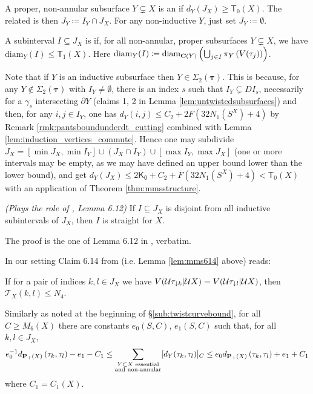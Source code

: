 \begin{defin}
A proper, non-annular subsurface $Y\subsetneq X$ is an  if $d_Y(J_X)\geq \mathsf{T}_0(X)$. The related  is then $J_Y\coloneqq I_Y\cap J_X$. For any non-inductive $Y$, just set $J_Y\coloneqq \emptyset$.

A subinterval $I\subseteq J_X$ is  if, for all non-annular, proper subsurfaces $Y\subsetneq X$, we have $\mathrm{diam}_Y(I)\leq\mathsf{T}_1(X)$. Here $\mathrm{diam}_Y(I)\coloneqq \mathrm{diam}_{\mathbf C(Y)}\left(\bigcup_{j\in I}\pi_Y\left(V(\tau_j)\right)\right)$.
\end{defin}
Note that if $Y$ is an inductive subsurface then $Y\in \Sigma_2(\bm\tau)$. This is because, for any $Y\not\in \Sigma_2(\bm\tau)$ with $I_Y\not=\emptyset$, there is an index $s$ such that $I_Y\subsetneq DI_s$, necessarily for a $\gamma_s$ intersecting $\partial Y$ (claims 1, 2 in Lemma \ref{lem:untwistedsubsurfaces}) and then, for any $i,j\in I_Y$, one has $d_Y(i,j)\leq C_2+2F(32N_1(S^X)+4)$ by Remark \ref{rmk:pantsboundunderdt_cutting} combined with Lemma \ref{lem:induction_vertices_commute}. Hence one may subdivide $J_X=[\min J_X, \min I_Y]\cup (J_X\cap I_Y) \cup [\max I_Y, \max J_X]$ (one or more intervals may be empty, as we may have defined an upper bound lower than the lower bound), and get $d_Y(J_X)\leq 2\mathsf{K_0} + C_2+F(32 N_1(S^X)+4)< \mathsf{T}_0(X)$ with an application of Theorem \ref{thm:mmsstructure}.

\begin{lemma}\label{lem:mms612} \emph{(Plays the role of \cite{mms}, Lemma 6.12)}
If $I\subseteq J_X$ is disjoint from all inductive subintervals of $J_X$, then $I$ is straight for $X$.
\end{lemma}
The proof is the one of Lemma 6.12 in \cite{mms}, verbatim.

In our setting Claim 6.14 from \cite{mms} (i.e. Lemma \ref{lem:mms614} above) reads:
\begin{claim}
If for a pair of indices $k,l\in J_X$ we have $V({\mathcal U}\tau_{\mathord{\downarrow} k}|{\mathcal U} X)=V({\mathcal U}\tau_{\mathord{\downarrow} l}|{\mathcal U} X)$, then $\mathcal T_X(k,l)\leq N_4$.
\end{claim}

Similarly as noted at the beginning of \S \ref{sub:twistcurvebound},  for all $C\geq M_6(X)$ there are constants $e_0(S,C)$, $e_1(S,C)$ such that, for all $k,l\in J_X$,
\begin{equation}\label{eqn:mmsubsurfaceproj_mixed}
e_0^{-1} d_{{\mathbf{P}_+}(X)}\left(\tau_k, \tau_l\right) - e_1 -C_1 \leq
\sum_{\substack{Y\subset X\text{ essential} \\ \text{and non-annular}}} [d_Y(\tau_k,\tau_l)]_C \leq
e_0 d_{{\mathbf{P}_+}(X)}\left(\tau_k, \tau_l\right) + e_1 + C_1
\end{equation}
where $C_1=C_1(X)$.

